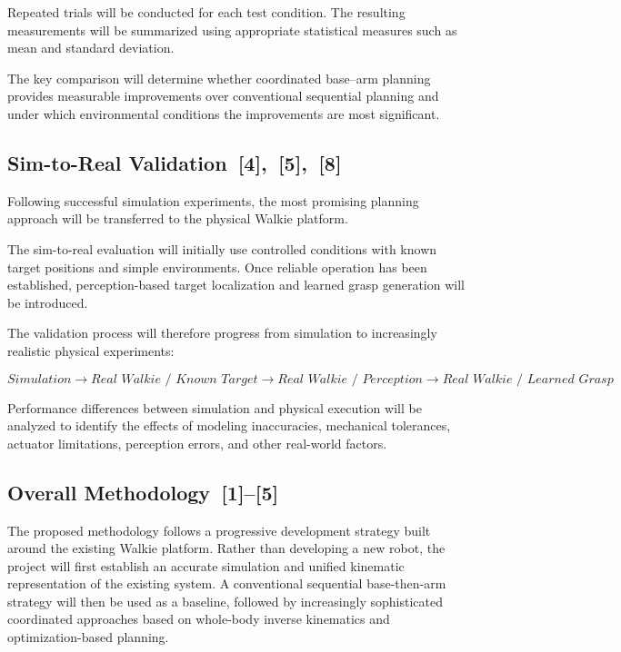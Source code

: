 \documentclass[12pt,a4paper]{article}
\begin{document}
Repeated trials will be conducted for each test condition. The resulting measurements will be
summarized using appropriate statistical measures such as mean and standard deviation.

The key comparison will determine whether coordinated base--arm planning provides
measurable improvements over conventional sequential planning and under which
environmental conditions the improvements are most significant.

\subsection*{Sim-to-Real Validation~[4],~[5],~[8]}

Following successful simulation experiments, the most promising planning approach will be
transferred to the physical Walkie platform.

The sim-to-real evaluation will initially use controlled conditions with known target positions
and simple environments. Once reliable operation has been established, perception-based
target localization and learned grasp generation will be introduced.

The validation process will therefore progress from simulation to increasingly realistic physical
experiments:

\begin{equation*}
\textit{Simulation} \rightarrow \textit{Real Walkie / Known Target} \rightarrow
\textit{Real Walkie / Perception} \rightarrow \textit{Real Walkie / Learned Grasp}
\end{equation*}

Performance differences between simulation and physical execution will be analyzed to identify
the effects of modeling inaccuracies, mechanical tolerances, actuator limitations, perception
errors, and other real-world factors.

\subsection*{Overall Methodology~[1]--[5]}

The proposed methodology follows a progressive development strategy built around the
existing Walkie platform. Rather than developing a new robot, the project will first establish an
accurate simulation and unified kinematic representation of the existing system. A conventional
sequential base-then-arm strategy will then be used as a baseline, followed by increasingly
sophisticated coordinated approaches based on whole-body inverse kinematics and
optimization-based planning.
\end{document}
